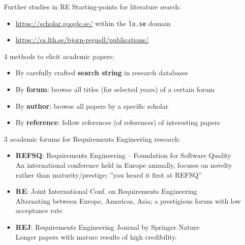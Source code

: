 \documentclass{simpleslides}
\begin{document}
\begin{frame}[fragile]{Further studies in RE}
  Starting-points for literature search:

\begin{itemize}\footnotesize
\item \url{https://scholar.google.se/} within the \texttt{lu.se} domain
\item \url{https://cs.lth.se/bjorn-regnell/publications/}
\end{itemize}

4 methods to elicit academic papers:
\begin{itemize}\footnotesize
\item By carefully crafted \textbf{search string} in research databases
\item By \textbf{forum}: browse all titles (for selected years) of a certain forum
\item By \textbf{author}: browse all papers by a specific scholar 
\item By \textbf{reference}: follow references (of references) of interesting papers
\end{itemize}

3 academic forums for Requirements Engineering research:
\begin{itemize}\footnotesize
\item \textbf{REFSQ}: Requirements Engineering -- Foundation for Software Quality \\An international conference held in Europe annually, focuses on novelty rather than maturity/prestige; ''you heard it first at REFSQ''
\item \textbf{RE}: Joint International Conf. on Requirements Engineering \\Alternating between Europe, Americas, Asia; a prestigious forum with low acceptance rate
\item \textbf{REJ}: Requirements Engineering Journal by Springer Nature \\ Longer papers with mature results of high credibility. 
\end{itemize}
  
\end{frame}
\end{document}
